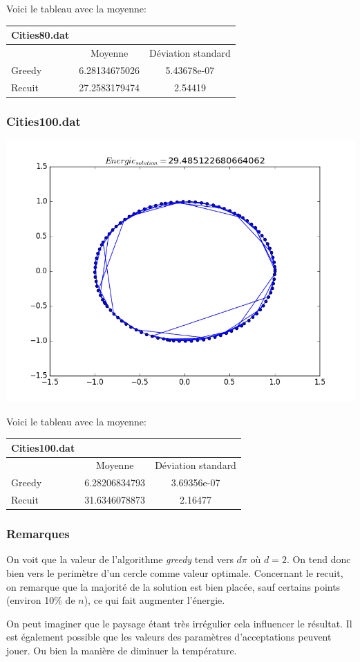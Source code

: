 \documentclass[a4paper, 11pt]{article}
\begin{document}
Voici le tableau avec la moyenne:\\
\begin{tabular}{|l | c |c |}
\hline
Cities80.dat & & \\
\hline
  & Moyenne & Déviation standard\\
  \hline
Greedy & 6.28134675026	 & 5.43678e-07\\
\hline
Recuit & 27.2583179474	 & 2.54419\\
\hline
\end{tabular}

\subsubsection{Cities100.dat}
\includegraphics[scale=0.75]{cities100}

Voici le tableau avec la moyenne:\\
\begin{tabular}{|l | c |c |}
\hline
Cities100.dat & & \\
\hline
  & Moyenne & Déviation standard\\
  \hline
Greedy & 6.28206834793	& 3.69356e-07\\
\hline
Recuit & 31.6346078873	 & 2.16477\\
\hline
\end{tabular}

\subsubsection{Remarques}
On voit que la valeur de l'algorithme \textit{greedy} tend vers $d\pi$ où $d=2$. On tend donc bien vers le perimètre d'un cercle comme 
valeur optimale.
Concernant le recuit, on remarque que la majorité de la solution est bien placée, sauf certains points (environ 10\% de $n$), ce qui
fait augmenter l'énergie.

On peut imaginer que le paysage étant très irrégulier cela influencer le résultat. Il est également possible que les valeurs des 
paramètres d'acceptations peuvent jouer. Ou bien la manière de diminuer la température.
\end{document}
